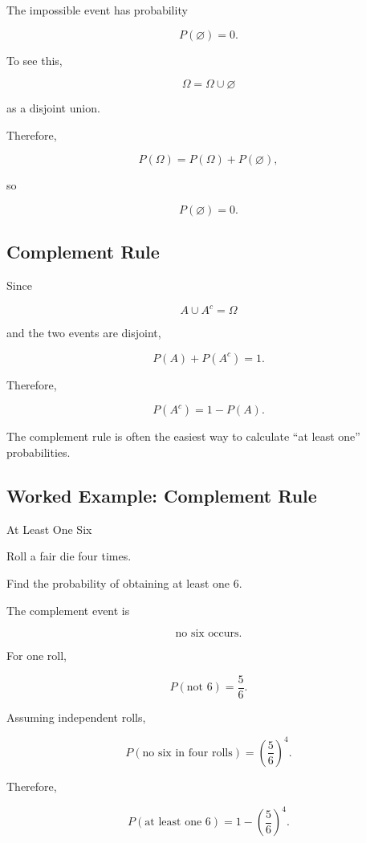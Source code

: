 The impossible event has probability

\[
\boxed{
P(\varnothing)=0.
}
\]

To see this,

\[
\Omega
=
\Omega\cup\varnothing
\]

as a disjoint union.

Therefore,

\[
P(\Omega)
=
P(\Omega)+P(\varnothing),
\]

so

\[
P(\varnothing)=0.
\]

\subsection{Complement Rule}
\label{subsec:complement-rule}

Since

\[
A\cup A^c=\Omega
\]

and the two events are disjoint,

\[
P(A)+P(A^c)=1.
\]

Therefore,

\[
\boxed{
P(A^c)=1-P(A).
}
\]

The complement rule is often the easiest way to calculate
``at least one'' probabilities.

\subsection{Worked Example: Complement Rule}
\label{subsec:worked-complement-rule}

\begin{workedexamplebox}{At Least One Six}

Roll a fair die four times.

Find the probability of obtaining at least one \(6\).

The complement event is

\[
\text{no six occurs}.
\]

For one roll,

\[
P(\text{not }6)=\frac56.
\]

Assuming independent rolls,

\[
P(\text{no six in four rolls})
=
\left(\frac56\right)^4.
\]

Therefore,

\begin{answerbox}
\[
\boxed{
P(\text{at least one }6)
=
1-\left(\frac56\right)^4.
}
\]
\end{answerbox}

\end{workedexamplebox}

